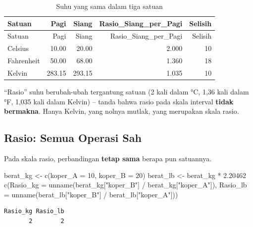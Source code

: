 \documentclass[
  indonesian,
  letterpaper,
]{book}
\newenvironment{Shaded}{\begin{snugshade}}{\end{snugshade}}
\newcommand{\AttributeTok}[1]{\textcolor[rgb]{0.40,0.45,0.13}{#1}}
\newcommand{\DecValTok}[1]{\textcolor[rgb]{0.68,0.00,0.00}{#1}}
\newcommand{\FloatTok}[1]{\textcolor[rgb]{0.68,0.00,0.00}{#1}}
\newcommand{\FunctionTok}[1]{\textcolor[rgb]{0.28,0.35,0.67}{#1}}
\newcommand{\NormalTok}[1]{\textcolor[rgb]{0.00,0.23,0.31}{#1}}
\newcommand{\OtherTok}[1]{\textcolor[rgb]{0.00,0.23,0.31}{#1}}
\newcommand{\SpecialCharTok}[1]{\textcolor[rgb]{0.37,0.37,0.37}{#1}}
\newcommand{\StringTok}[1]{\textcolor[rgb]{0.13,0.47,0.30}{#1}}
\begin{document}
\begin{longtable}[]{@{}lrrrr@{}}
\caption{Suhu yang sama dalam tiga satuan}\tabularnewline
\toprule\noalign{}
Satuan & Pagi & Siang & Rasio\_Siang\_per\_Pagi & Selisih \\
\midrule\noalign{}
\endfirsthead
\toprule\noalign{}
Satuan & Pagi & Siang & Rasio\_Siang\_per\_Pagi & Selisih \\
\midrule\noalign{}
\endhead
\bottomrule\noalign{}
\endlastfoot
Celsius & 10.00 & 20.00 & 2.000 & 10 \\
Fahrenheit & 50.00 & 68.00 & 1.360 & 18 \\
Kelvin & 283.15 & 293.15 & 1.035 & 10 \\
\end{longtable}

``Rasio'' suhu berubah-ubah tergantung satuan (2 kali dalam °C, 1,36
kali dalam °F, 1,035 kali dalam Kelvin) -- tanda bahwa rasio pada skala
interval \textbf{tidak bermakna}. Hanya Kelvin, yang nolnya mutlak, yang
merupakan skala rasio.

\subsection{Rasio: Semua Operasi Sah}\label{rasio-semua-operasi-sah}

Pada skala rasio, perbandingan \textbf{tetap sama} berapa pun satuannya.

\begin{Shaded}
\begin{Highlighting}[]
\NormalTok{berat\_kg }\OtherTok{\textless{}{-}} \FunctionTok{c}\NormalTok{(}\AttributeTok{koper\_A =} \DecValTok{10}\NormalTok{, }\AttributeTok{koper\_B =} \DecValTok{20}\NormalTok{)}
\NormalTok{berat\_lb }\OtherTok{\textless{}{-}}\NormalTok{ berat\_kg }\SpecialCharTok{*} \FloatTok{2.20462}
\FunctionTok{c}\NormalTok{(}\AttributeTok{Rasio\_kg =} \FunctionTok{unname}\NormalTok{(berat\_kg[}\StringTok{"koper\_B"}\NormalTok{] }\SpecialCharTok{/}\NormalTok{ berat\_kg[}\StringTok{"koper\_A"}\NormalTok{]),}
\AttributeTok{Rasio\_lb =} \FunctionTok{unname}\NormalTok{(berat\_lb[}\StringTok{"koper\_B"}\NormalTok{] }\SpecialCharTok{/}\NormalTok{ berat\_lb[}\StringTok{"koper\_A"}\NormalTok{]))}
\end{Highlighting}
\end{Shaded}

\begin{verbatim}
Rasio_kg Rasio_lb 
       2        2 
\end{verbatim}
\end{document}
